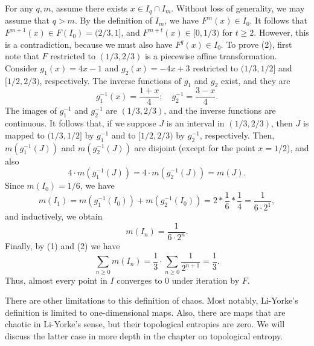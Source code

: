 \documentclass[12pt,draft,twoside]{book}
\begin{document}
\begin{example}
For any $q,m$, assume there exists $x \in I_q \cap I_m$. 
Without loss of generality, we may assume that $q > m$.
By the definition of $I_m$, we have $F^m(x) \in I_0$.
It follows that $F^{m+1}(x) \in F(I_0) = (2/3, 1]$, and $F^{m+t}(x) \in [0, 1/3)$ for $t \geq 2$.
However, this is a contradiction, because we must also have $F^q(x) \in I_0$.
%
To prove (2), first note that $F$ restricted to $(1/3, 2/3)$ is a piecewise affine transformation.
Consider $g_1(x) = 4x - 1$ and $g_2(x) = -4x + 3$ restricted to $(1/3,1/2]$ and $[1/2,2/3)$, respectively.
The inverse functions of $g_1$ and $g_2$ exist, and they are
\begin{equation*}
  g_1^{-1}(x) = \frac{1+x}{4}; \quad g_2^{-1} = \frac{3-x}{4}.
\end{equation*}
The images of $g_1^{-1}$ and $g_2^{-1}$ are $(1/3,2/3)$, and the inverse functions are continuous.
It follows that, if we suppose $J$ is an interval in $(1/3,2/3)$, then $J$ is mapped to $(1/3,1/2]$ by $g_1^{-1}$ and to $[1/2,2/3)$ by $g_2^{-1}$, respectively.
Then, $m(g_1^{-1}(J))$ and $m(g_2^{-1}(J))$ are disjoint (except for the point $x = 1/2$), and also
\begin{equation*}
  4 \cdot m(g_1^{-1}(J)) = 4 \cdot m(g_2^{-1}(J)) = m(J).
\end{equation*}
Since $m(I_0) = 1/6$, we have
\begin{equation*}
  m(I_1) 
  = m(g_1^{-1}(I_0)) + m(g_2^{-1}(I_0))
  = 2 * \frac{1}{6} * \frac{1}{4}
  = \frac{1}{6\cdot 2^1},
\end{equation*}
and inductively, we obtain
\begin{equation*}
  m(I_n) = \frac{1}{6 \cdot 2^n}.
\end{equation*}
%
Finally, by (1) and (2) we have
\begin{equation*}
  \sum\limits_{n\geq 0} m(I_n)
  = \frac{1}{3} \cdot \sum\limits_{n\geq 0} \frac{1}{2^{n+1}}
  = \frac{1}{3}.
\end{equation*}
Thus, almost every point in $I$ converges to 0 under iteration by $F$.
\end{example}


There are other limitations to this definition of chaos.
Most notably, Li-Yorke's definition is limited to one-dimensional maps.
Also, there are maps that are chaotic in Li-Yorke's sense, but their topological entropies are zero.
We will discuss the latter case in more depth in the chapter on topological entropy.




\printindex
\end{document}

